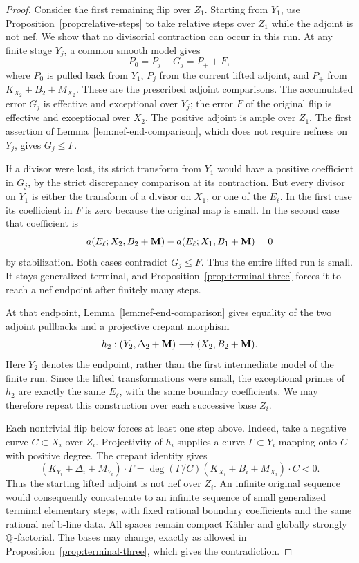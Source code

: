 \begin{proof}
Consider the first remaining flip over $Z_1$.  Starting from $Y_1$, use
Proposition~\ref{prop:relative-steps} to take relative steps over $Z_1$
while the adjoint is not nef.  We show that no divisorial contraction can
occur in this run.  At any finite stage $Y_j$, a common smooth model gives
\[
 P_0=P_j+G_j=P_++F,
\]
where $P_0$ is pulled back from $Y_1$, $P_j$ from the current lifted
adjoint, and $P_+$ from $K_{X_2}+B_2+M_{X_2}$.  These are the prescribed
adjoint comparisons.  The accumulated error $G_j$ is effective and
exceptional over $Y_j$; the error $F$ of the original flip is effective
and exceptional over $X_2$.  The positive adjoint is ample over $Z_1$.
The first assertion of Lemma~\ref{lem:nef-end-comparison}, which does not
require nefness on $Y_j$, gives $G_j\leq F$.

If a divisor were lost, its strict transform from $Y_1$ would have a
positive coefficient in $G_j$, by the strict discrepancy comparison at
its contraction.  But every divisor on $Y_1$ is either the transform of a
divisor on $X_1$, or one of the $E_\ell$.  In the first case its
coefficient in $F$ is zero because the original map is small.  In the
second case that coefficient is
\[
 a(E_\ell;X_2,B_2+\mathbf M)-a(E_\ell;X_1,B_1+\mathbf M)=0
\]
by stabilization.  Both cases contradict $G_j\leq F$.  Thus the entire
lifted run is small.  It stays generalized terminal, and
Proposition~\ref{prop:terminal-three} forces it to reach a nef endpoint
after finitely many steps.

At that endpoint, Lemma~\ref{lem:nef-end-comparison} gives equality of
the two adjoint pullbacks and a projective crepant morphism
\[
 h_2:(Y_2,\Delta_2+\mathbf M)\longrightarrow(X_2,B_2+\mathbf M).
\]
Here $Y_2$ denotes the endpoint, rather than the first intermediate model
of the finite run.  Since the lifted transformations were small, the
exceptional primes of $h_2$ are exactly the same $E_\ell$, with the same
boundary coefficients.  We may therefore repeat this construction over
each successive base $Z_i$.

Each nontrivial flip below forces at least one step above.  Indeed, take a
negative curve $C\subset X_i$ over $Z_i$.  Projectivity of $h_i$ supplies
a curve $\Gamma\subset Y_i$ mapping onto $C$ with positive degree.  The
crepant identity gives
\[
 (K_{Y_i}+\Delta_i+M_{Y_i})\cdot\Gamma
   =\deg(\Gamma/C)(K_{X_i}+B_i+M_{X_i})\cdot C<0.
\]
Thus the starting lifted adjoint is not nef over $Z_i$.
An infinite original sequence would consequently concatenate to an
infinite sequence of small generalized terminal elementary steps, with
fixed rational boundary coefficients and the same rational nef b-line
data.  All spaces remain compact K\"ahler and globally strongly
$\mathbb Q$-factorial.  The bases may change, exactly as allowed in
Proposition~\ref{prop:terminal-three}, which gives the contradiction.
\end{proof}
